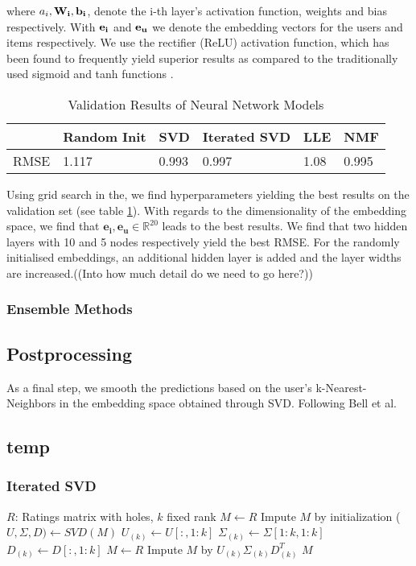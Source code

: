 \documentclass[10pt,conference,compsocconf]{IEEEtran}
\begin{document}
where $a_i,\bf{W_i}, \bf{b_i}$, denote the i-th layer's activation function, weights and bias respectively. With $\bf{e_i}$ and $\bf{e_u}$ we denote the embedding vectors for the users and items respectively. We use the rectifier (ReLU) activation function, which has been found to frequently yield superior results as compared to the traditionally used sigmoid and tanh functions \cite{glorot2011deep}.


\begin{table}[ht]
\centering
\caption{Validation Results of Neural Network Models}
\label{table:neural_net_models}
\begin{tabular}{|l|l|l|l|l|l|}
\hline
     & Random Init & SVD & Iterated SVD & LLE & NMF \\ \hline
RMSE & 1.117           & 0.993   & 0.997           & 1.08   & 0.995   \\ \hline
\end{tabular}
\end{table}

Using grid search in the, we find hyperparameters yielding the best results on the validation set (see table \ref{table:neural_net_models}). 
With regards to the dimensionality of the embedding space, we find that $\mathbf{e_i}, \mathbf{e_u} \in  \mathbb{R}^{20}$ leads to the best results. We find that two hidden layers with 10 and 5 nodes respectively yield the best RMSE. For the randomly initialised embeddings, an additional hidden layer is added and the layer widths are increased.((Into how much detail do we need to go here?))




\subsubsection{Ensemble Methods}

\subsection{Postprocessing}
As a final step, we smooth the predictions based on the user's  k-Nearest-Neighbors in the embedding space obtained through SVD. Following Bell et al. \cite{bell2007improved}

\subsection{temp}
\subsubsection{Iterated SVD}
\begin{algorithmic}
	\STATE $R$: Ratings matrix with holes, $k$ fixed rank
	\STATE $M \leftarrow R$
	\STATE Impute $M$ by initialization
    	\STATE ($U, \Sigma, D) \leftarrow SVD(M)$
    	\STATE $U_{(k)} \leftarrow U[:, 1:k]$
    	\STATE $\Sigma_{(k)} \leftarrow \Sigma[1:k, 1:k]$
    	\STATE $D_{(k)} \leftarrow D[:, 1:k]$
    	\STATE $M \leftarrow R$
    	\STATE Impute $M$ by $U_{(k)} \Sigma_{(k)} D_{(k)}^T$
    \ENDFOR
    \RETURN $M$
\end{algorithmic}
\end{document}
